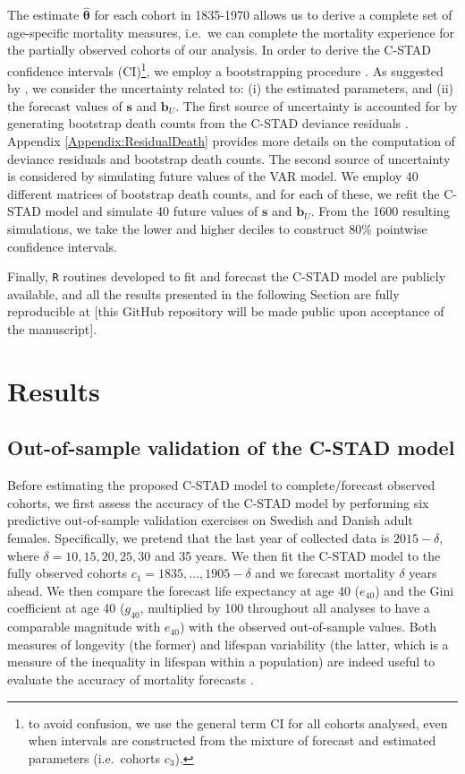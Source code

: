 \documentclass[11pt, a4paper]{article}
\begin{document}
The estimate $\hat{\bm{\theta}}$ for each cohort in 1835-1970 allows us to derive a complete set of age-specific mortality measures, i.e.~we can complete the mortality experience for the partially observed cohorts of our analysis. In order to derive the C-STAD confidence intervals (CI)\footnote{to avoid confusion, we use the general term CI for all cohorts analysed, even when intervals are constructed from the mixture of forecast and estimated parameters (i.e.~cohorts $c_3$).}, we employ a bootstrapping procedure \citep{efron1994introduction}. As suggested by \cite{keilman2006prediction}, we consider the uncertainty related to: (i) the estimated parameters, and (ii) the forecast values of $\bm{s}$ and $\bm{b}_U$. The first source of uncertainty is accounted for by generating bootstrap death counts from the C-STAD deviance residuals \cite[as in, for example,][]{koissi2006evaluating,renshaw2008simulation,ouellette2012regional}. Appendix \ref{Appendix:ResidualDeath} provides more details on the computation of deviance residuals and bootstrap death counts. The second source of uncertainty is considered by simulating future values of the VAR model. We employ 40 different matrices of bootstrap death counts, and for each of these, we refit the C-STAD model and simulate 40 future values of $\bm{s}$ and $\bm{b}_U$. From the 1600 resulting simulations, we take the lower and higher deciles to construct 80\% pointwise confidence intervals.

Finally, \texttt{R} routines developed to fit and forecast the C-STAD model are publicly available, and all the results presented in the following Section are fully reproducible at [this GitHub repository will be made public upon acceptance of the manuscript]. 

\section{Results}
\label{Sec:Results}

\subsection{Out-of-sample validation of the C-STAD model}
\label{Subsec:Out-of-sample}
Before estimating the proposed C-STAD model to complete/forecast observed cohorts, we first assess the accuracy of the C-STAD model by performing six predictive out-of-sample validation exercises on Swedish and Danish adult females. Specifically, we pretend that the last year of collected data is $2015 - \delta$, where $\delta=10,15,20,25,30$ and 35 years. We then fit the C-STAD model to the fully observed cohorts $c_1=1835,\ldots,1905-\delta$ and we forecast mortality $\delta$ years ahead. We then compare the forecast life expectancy at age 40 ($e_{40}$) and the Gini coefficient at age 40 ($g_{40}$, multiplied by 100 throughout all analyses to have a comparable magnitude with $e_{40}$) with the observed out-of-sample values. Both measures of longevity (the former) and lifespan variability (the latter, which is a measure of the inequality in lifespan within a population) are indeed useful to evaluate the accuracy of mortality forecasts \citep{bohk2017lifespan}.
\end{document}
